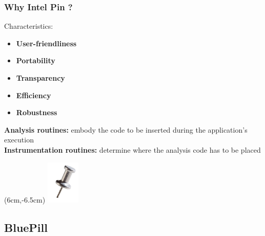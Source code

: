 \documentclass[compress]{beamer}
\begin{document}
\begin{frame}
    \frametitle{Why Intel Pin ?}
    
	Characteristics:
	\begin{itemize}
	\item \textbf{User-friendliness}
	\item \textbf{Portability}
	\item \textbf{Transparency}
	\item \textbf{Efficiency}
	\item \textbf{Robustness}
	\end{itemize}
	\medskip
	\textbf{Analysis routines:} embody the code to be inserted during the application's execution\\
	\smallskip
	\textbf{Instrumentation routines:} determine where the analysis code has to be placed\\
	\bigskip

    
    \begin{textblock*}{3cm}(6cm,-6.5cm)
   \includegraphics[width=1.6cm]{image/pin.png}%
	\end{textblock*}
	
	

\end{frame}

\subsection{BluePill}
\end{document}
